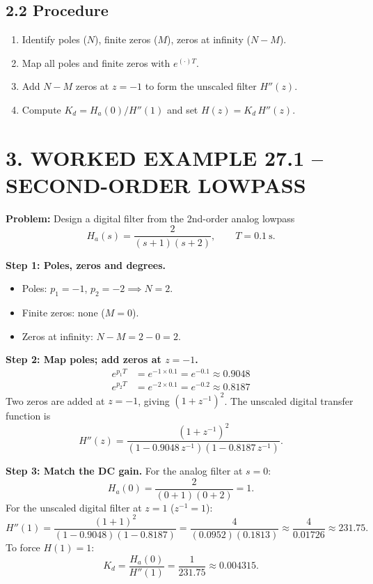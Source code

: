 \documentclass[11pt,a4paper]{article}
\begin{document}
\subsection{2.2 Procedure}
\begin{enumerate}
    \item Identify poles ($N$), finite zeros ($M$), zeros at infinity ($N-M$).
    \item Map all poles and finite zeros with $e^{(\cdot)T}$.
    \item Add $N-M$ zeros at $z=-1$ to form the unscaled filter $H''(z)$.
    \item Compute $K_d = H_a(0)/H''(1)$ and set $H(z) = K_d\,H''(z)$.
\end{enumerate}

\section{3. WORKED EXAMPLE 27.1 -- SECOND-ORDER LOWPASS}

\noindent\textbf{Problem:} Design a digital filter from the 2nd-order analog lowpass
\begin{equation}
H_a(s) = \frac{2}{(s+1)(s+2)}, \qquad T = 0.1\ \text{s}.
\end{equation}

\noindent\textbf{Step 1: Poles, zeros and degrees.}
\begin{itemize}
    \item Poles: $p_1 = -1$, $p_2 = -2 \implies N = 2$.
    \item Finite zeros: none ($M=0$).
    \item Zeros at infinity: $N - M = 2 - 0 = 2$.
\end{itemize}

\noindent\textbf{Step 2: Map poles; add zeros at $z=-1$.}
\begin{align}
e^{p_1 T} &= e^{-1\times 0.1} = e^{-0.1} \approx 0.9048 \\
e^{p_2 T} &= e^{-2\times 0.1} = e^{-0.2} \approx 0.8187
\end{align}
Two zeros are added at $z=-1$, giving $(1+z^{-1})^2$. The unscaled digital transfer function is
\begin{equation}
H''(z) = \frac{(1+z^{-1})^2}{(1 - 0.9048\,z^{-1})(1 - 0.8187\,z^{-1})}.
\end{equation}

\noindent\textbf{Step 3: Match the DC gain.} For the analog filter at $s=0$:
\begin{equation}
H_a(0) = \frac{2}{(0+1)(0+2)} = 1.
\end{equation}
For the unscaled digital filter at $z=1$ ($z^{-1}=1$):
\begin{equation}
H''(1) = \frac{(1+1)^2}{(1-0.9048)(1-0.8187)} = \frac{4}{(0.0952)(0.1813)} \approx \frac{4}{0.01726} \approx 231.75.
\end{equation}
To force $H(1) = 1$:
\begin{equation}
K_d = \frac{H_a(0)}{H''(1)} = \frac{1}{231.75} \approx 0.004315.
\end{equation}
\end{document}
